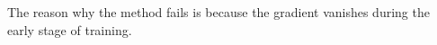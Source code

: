 The reason why the method fails is because the gradient vanishes during the early stage of training.
